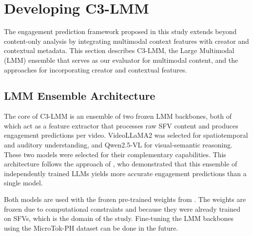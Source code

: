 

\section{Developing C3-LMM}

The engagement prediction framework proposed in this study extends beyond content-only analysis by integrating multimodal context features with creator and contextual metadata. This section describes C3-LMM, the Large Multimodal (LMM) ensemble that serves as our evaluator for multimodal content, and the approaches for incorporating creator and contextual features.

\subsection{LMM Ensemble Architecture}

The core of C3-LMM is an ensemble of two frozen LMM backbones, both of which act as a feature extractor that processes raw SFV content and produces engagement predictions per video. VideoLLaMA2 was selected for spatiotemporal and auditory understanding, and Qwen2.5-VL for visual-semantic reasoning. These two models were selected for their complementary capabilities. This architecture follows the approach of \citeauthor{sun2025engagement} \citeyear{sun2025engagement}, who demonstrated that this ensemble of independently trained LLMs yields more accurate engagement predictions than a single model.

Both models are used with the frozen pre-trained weights from \citeauthor{sun2025engagement} \citeyear{sun2025engagement}. The weights are frozen due to computational constraints and because they were already trained on SFVs, which is the domain of the study. Fine-tuning the LMM backbones using the MicroTok-PH dataset can be done in the future.


